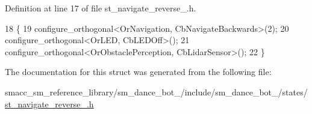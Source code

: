 Definition at line 17 of file st\+\_\+navigate\+\_\+reverse\+\_.\+h.


\begin{DoxyCode}
18    \{
19       configure\_orthogonal<OrNavigation, CbNavigateBackwards>(2);
20       configure\_orthogonal<OrLED, CbLEDOff>();
21       configure\_orthogonal<OrObstaclePerception, CbLidarSensor>();
22    \}
\end{DoxyCode}


The documentation for this struct was generated from the following file\+:\begin{DoxyCompactItemize}
\item 
smacc\+\_\+sm\+\_\+reference\+\_\+library/sm\+\_\+dance\+\_\+bot\+\_/include/sm\+\_\+dance\+\_\+bot\+\_/states/\hyperlink{3_2include_2sm__dance__bot__3_2states_2st__navigate__reverse__3_8h}{st\+\_\+navigate\+\_\+reverse\+\_.\+h}\end{DoxyCompactItemize}

